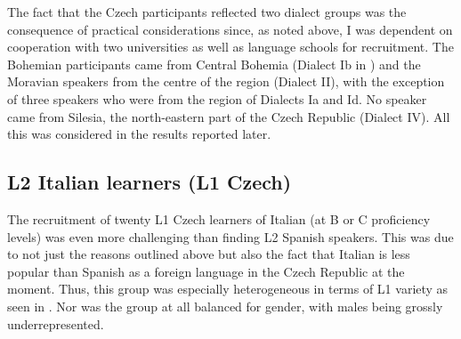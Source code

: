 The fact that the Czech participants reflected two dialect groups was the consequence of practical considerations since, as noted above, I was dependent on cooperation with two universities as well as language schools for recruitment. The Bohemian participants came from Central Bohemia (Dialect Ib in ) and the Moravian speakers from the centre of the region (Dialect II), with the exception of three speakers who were from the region of Dialects Ia and Id. No speaker came from Silesia, the north-eastern part of the Czech Republic (Dialect IV). All this was considered in the results reported later.


\subsection{L2 Italian learners (L1 Czech)}\label{sec:3.2.2}

The recruitment of twenty L1 Czech learners of Italian (at B or C proficiency levels) was even more challenging than finding L2 Spanish speakers. This was due to not just the reasons outlined above but also the fact that Italian is less popular than Spanish as a foreign language in the Czech Republic at the moment. Thus, this group was especially heterogeneous in terms of L1 variety as seen in . Nor was the group at all balanced for gender, with males being grossly underrepresented.


